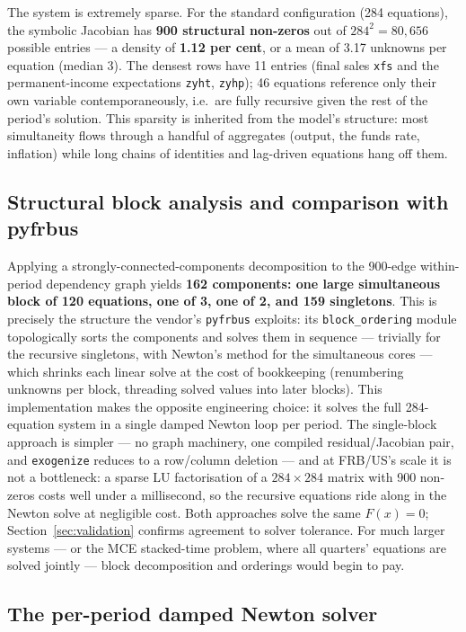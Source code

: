 The system is extremely sparse. For the standard configuration (284 equations), the symbolic Jacobian has \textbf{900 structural non-zeros} out of $284^2 = 80{,}656$ possible entries --- a density of \textbf{1.12 per cent}, or a mean of 3.17 unknowns per equation (median 3). The densest rows have 11 entries (final sales \texttt{xfs} and the permanent-income expectations \texttt{zyht}, \texttt{zyhp}); 46 equations reference only their own variable contemporaneously, i.e.\ are fully recursive given the rest of the period's solution. This sparsity is inherited from the model's structure: most simultaneity flows through a handful of aggregates (output, the funds rate, inflation) while long chains of identities and lag-driven equations hang off them.

\subsection{Structural block analysis and comparison with pyfrbus}
\label{sec:blocks}

Applying a strongly-connected-components decomposition to the 900-edge within-period dependency graph yields \textbf{162 components: one large simultaneous block of 120 equations, one of 3, one of 2, and 159 singletons}. This is precisely the structure the vendor's \texttt{pyfrbus} exploits: its \texttt{block\_ordering} module topologically sorts the components and solves them in sequence --- trivially for the recursive singletons, with Newton's method for the simultaneous cores --- which shrinks each linear solve at the cost of bookkeeping (renumbering unknowns per block, threading solved values into later blocks). This implementation makes the opposite engineering choice: it solves the full 284-equation system in a single damped Newton loop per period. The single-block approach is simpler --- no graph machinery, one compiled residual/Jacobian pair, and \texttt{exogenize} reduces to a row/column deletion --- and at FRB/US's scale it is not a bottleneck: a sparse LU factorisation of a $284\times284$ matrix with 900 non-zeros costs well under a millisecond, so the recursive equations ride along in the Newton solve at negligible cost. Both approaches solve the same $F(x)=0$; Section~\ref{sec:validation} confirms agreement to solver tolerance. For much larger systems --- or the MCE stacked-time problem, where all quarters' equations are solved jointly --- block decomposition and orderings would begin to pay.

\subsection{The per-period damped Newton solver}
\label{sec:newton}

